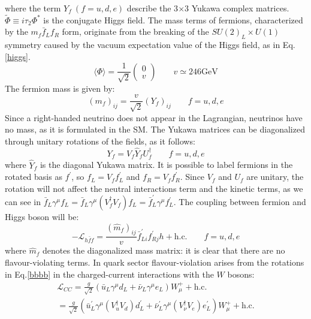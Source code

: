 where the term $Y_f \ (f  =  u,d,e)$ describe the 3$\times$3 Yukawa complex matrices. $\widetilde{\Phi} \equiv i \tau_2 \Phi^*$ is the conjugate Higgs field. The mass terms of fermions, characterized by the $m_f \bar{f}_L f_R$ form, originate from the breaking of the $SU(2)_L \times U(1)$ symmetry caused by the vacuum expectation value of the Higgs field, as in Eq.\ref{higgs}.
\begin{equation}\label{higgs}
\langle\Phi\rangle=\frac{1}{\sqrt{2}}\left(\begin{array}{l}
0 \\
v
\end{array}\right) \qquad v \simeq 246 \mathrm{GeV}
\end{equation}
The fermion mass is given by:
\begin{equation}
\left(m_f\right)_{i j}=\frac{v}{\sqrt{2}}\left(Y_f\right)_{i j} \qquad f=u, d, e
\end{equation}
Since a right-handed neutrino does not appear in the Lagrangian, neutrinos have no mass, as it is formulated in the SM. The Yukawa matrices can be diagonalized 
through unitary rotations of the fields, as it follows:
\begin{equation}\label{bbbb}
Y_f=V_f \hat{Y}_f U_f^{\dagger} \qquad f=u, d, e
\end{equation}
where $ \hat{Y}_f $ is the diagonal Yukawa matrix. It is possible to label fermions in the rotated basis as $f^{\prime}$, so $f_L=V_f f^{\prime}_L$ and $f_R=V_f f^{\prime}_R $. Since $V_f$ and $U_f$ are unitary, the rotation will not affect the neutral interactions term and the kinetic terms, as we can see in $\bar{f}_L \gamma^\mu f_L=\bar{f}_L \gamma^\mu\left(V_f^{\dagger} V_f\right) f_L=\bar{f}_L^{\prime} \gamma^\mu f_L^{\prime}$. The coupling between fermion and Higgs boson will be:
\begin{equation}
-\mathscr{L}_{h \bar{f} f}=\frac{(\hat{m}_f)_{i j}}{v} \bar{f}_{L i}^{\prime}f^{\prime}_{R j} h+\text{h.c.} \qquad f=u, d, e
\end{equation}
where $\hat{m}_f$ denotes the diagonalized mass matrix: it is clear that there are no flavour-violating terms.
In quark sector flavour-violation arises from the rotations in Eq.\ref{bbbb} in the charged-current interactions with the $W$ bosons:
\begin{equation}\label{quarkviolation}
\begin{array}{c}
      { \displaystyle 
\mathscr{L}_{C C}  =\frac{g}{\sqrt{2}}\left(\bar{u}_L \gamma^\mu d_L+\bar{\nu}_L \gamma^\mu e_L\right) W_\mu^{+}+\text {h.c.} }\\
 {\displaystyle=\frac{g}{\sqrt{2}}\left(\bar{u}^{\prime}_L \gamma^\mu\left(V_u^{\dagger} V_d\right) d_L^{\prime}+\bar{\nu}^{\prime}_L \gamma^\mu\left(V_\nu^{\dagger} V_e\right) e_L^{\prime}\right) W_\mu^{+}+\text {h.c.}}
\end{array}
\end{equation}

